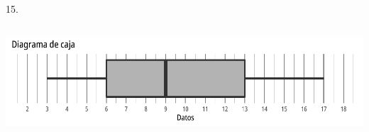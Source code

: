 \documentclass{cdplf-prueba}
\begin{document}
\begin{tasks}
15.\end{tasks}
\subsection{}
\begin{center}\includegraphics{diagrama_caja_1.pdf}\end{center}
\end{document}
